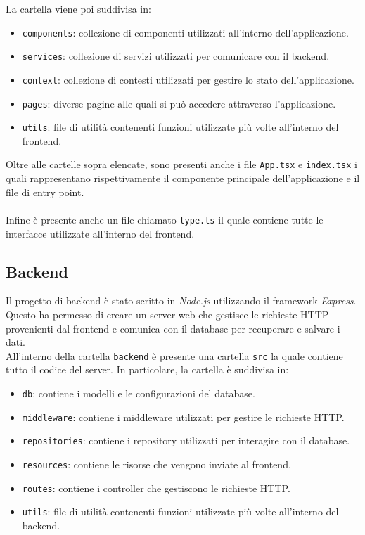 \documentclass[twoside]{supsistudent}
\begin{document}
La cartella viene poi suddivisa in:

\begin{itemize}
  \item \texttt{components}: collezione di componenti utilizzati all'interno dell'applicazione.
  \item \texttt{services}: collezione di servizi utilizzati per comunicare con il backend.
  \item \texttt{context}: collezione di contesti utilizzati per gestire lo stato dell'applicazione.
  \item \texttt{pages}: diverse pagine alle quali si può accedere attraverso l'applicazione.
  \item \texttt{utils}: file di utilità contenenti funzioni utilizzate più volte all'interno del frontend.
\end{itemize}

Oltre alle cartelle sopra elencate, sono presenti anche i file \texttt{App.tsx} e \texttt{index.tsx} i quali rappresentano rispettivamente il componente principale dell'applicazione e il file di entry point.
\\\\
Infine è presente anche un file chiamato \texttt{type.ts} il quale contiene tutte le interfacce utilizzate all'interno del frontend.

\subsection{Backend}
Il progetto di backend è stato scritto in \textit{Node.js} utilizzando il framework \textit{Express}. Questo ha permesso di creare un server web che gestisce le richieste HTTP provenienti dal frontend e comunica con il database per recuperare e salvare i dati.\\

All'interno della cartella \texttt{backend} è presente una cartella \texttt{src} la quale contiene tutto il codice del server. In particolare, la cartella è suddivisa in:
\begin{itemize}
  \item \texttt{db}: contiene i modelli e le configurazioni del database.
  \item \texttt{middleware}: contiene i middleware utilizzati per gestire le richieste HTTP.
  \item \texttt{repositories}: contiene i repository utilizzati per interagire con il database.
  \item \texttt{resources}: contiene le risorse che vengono inviate al frontend.
  \item \texttt{routes}: contiene i controller che gestiscono le richieste HTTP.
  \item \texttt{utils}: file di utilità contenenti funzioni utilizzate più volte all'interno del backend.
\end{itemize}
\end{document}
